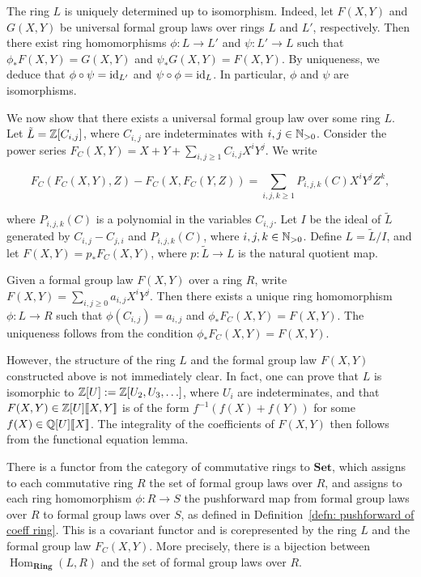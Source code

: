 \begin{remark}
The ring $L$ is uniquely determined up to isomorphism. Indeed,
let $F(X,Y)$ and $G(X,Y)$ be universal formal group laws over rings $L$ and $L'$,
respectively. Then there exist ring homomorphisms $\phi : L \to L'$ and $\psi : L' \to L$
such that $\phi_* F(X,Y) = G(X,Y)$ and $\psi_* G(X,Y) = F(X,Y)$. By uniqueness,
we deduce that $\phi \circ \psi = \mathrm{id}_{L'}$ and $\psi \circ \phi = \mathrm{id}_L$.
In particular, $\phi$ and $\psi$ are isomorphisms.

We now show that there exists a universal formal group law over some ring $L$.
Let $\tilde{L} = \mathbb{Z} [C_{i,j}]$, where $C_{i,j}$ are indeterminates with $i,j \in \mathbb{N}_{>0}$.
Consider the power series $F_C(X,Y) = X + Y + \sum_{i,j \ge 1} C_{i,j} X^i Y^j$. We write

\[F_C(F_C(X,Y),Z) - F_C(X,F_C(Y,Z)) = \sum_{i,j,k \ge 1} P_{i,j,k}(C) X^i Y^j Z^k,\]

where $P_{i,j,k}(C)$ is a polynomial in the variables $C_{i,j}$.
Let $I$ be the ideal of $\tilde{L}$ generated by $C_{i,j} - C_{j,i}$ and $P_{i,j,k}(C)$,
where $i,j,k \in \mathbb{N}_{>0}$. Define $L = \tilde{L}/I$, and let $F(X,Y) = p_*F_C(X,Y)$,
where $p : \tilde{L} \to L$ is the natural quotient map.

Given a formal group law $F(X,Y)$ over a ring $R$, write
$F(X,Y) = \sum_{i,j \ge 0} a_{i,j} X^i Y^j$. Then there exists a unique ring homomorphism
$\phi : L \to R$ such that $\phi(C_{i,j}) = a_{i,j}$ and $\phi_* F_C(X,Y) = F(X,Y)$.
The uniqueness follows from the condition $\phi_* F_C(X,Y) = F(X,Y)$.

However, the structure of the ring $L$ and the formal group law $F(X,Y)$ constructed
above is not immediately clear. In fact, one can prove that $L$ is isomorphic to
$\mathbb{Z}[U] := \mathbb{Z}[U_2, U_3, \ldots]$, where $U_i$ are indeterminates, and that
$F(X,Y) \in \mathbb{Z}[U][\![X,Y]\!]$ is of the form $f^{-1}(f(X) + f(Y))$ for some
$f(X) \in \mathbb{Q}[U][\![X]\!]$. The integrality of the coefficients of $F(X,Y)$ then follows
from the functional equation lemma.
\end{remark}

\begin{remark}
There is a functor from the category of commutative rings to $\mathbf{Set}$, which assigns
to each commutative ring $R$ the set of formal group laws over $R$, and assigns to each ring
homomorphism $\phi : R \to S$ the pushforward map from formal group laws over $R$ to formal
 group laws over $S$, as defined in Definition~\ref{defn: pushforward of coeff ring}. This is a covariant functor and is corepresented by the ring $L$ and the formal group law $F_C(X,Y)$. More precisely, there is a bijection between $\operatorname{Hom}_{\mathbf{Ring}}(L, R)$ and the set of formal group laws over $R$.
\end{remark}